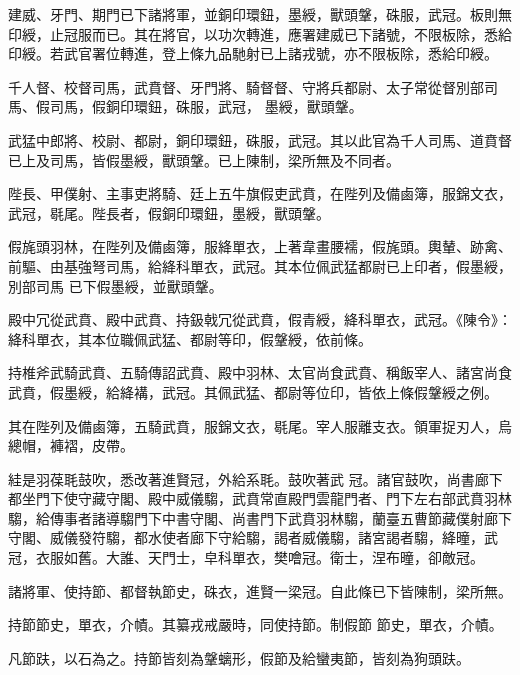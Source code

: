 \begin{pinyinscope}
 建威、牙門、期門已下諸將軍，並銅印環鈕，墨綬，獸頭鞶，硃服，武冠。板則無印綬，止冠服而已。其在將官，以功次轉進，應署建威已下諸號，不限板除，悉給印綬。若武官署位轉進，登上條九品馳射已上諸戎號，亦不限板除，悉給印綬。



 千人督、校督司馬，武賁督、牙門將、騎督督、守將兵都尉、太子常從督別部司馬、假司馬，假銅印環鈕，硃服，武冠，
 墨綬，獸頭鞶。



 武猛中郎將、校尉、都尉，銅印環鈕，硃服，武冠。其以此官為千人司馬、道賁督已上及司馬，皆假墨綬，獸頭鞶。已上陳制，梁所無及不同者。



 陛長、甲僕射、主事吏將騎、廷上五牛旗假吏武賁，在陛列及備鹵簿，服錦文衣，武冠，毼尾。陛長者，假銅印環鈕，墨綬，獸頭鞶。



 假旄頭羽林，在陛列及備鹵簿，服絳單衣，上著韋畫腰襦，假旄頭。輿輦、跡禽、前驅、由基強弩司馬，給絳科單衣，武冠。其本位佩武猛都尉已上印者，假墨綬，別部司馬
 已下假墨綬，並獸頭鞶。



 殿中冗從武賁、殿中武賁、持鈒戟冗從武賁，假青綬，絳科單衣，武冠。《陳令》：絳科單衣，其本位職佩武猛、都尉等印，假鞶綬，依前條。



 持椎斧武騎武賁、五騎傳詔武賁、殿中羽林、太官尚食武賁、稱飯宰人、諸宮尚食武賁，假墨綬，給絳褠，武冠。其佩武猛、都尉等位印，皆依上條假鞶綬之例。



 其在陛列及備鹵簿，五騎武賁，服錦文衣，毼尾。宰人服離支衣。領軍捉刃人，烏總帽，褲褶，皮帶。



 絓是羽葆毦鼓吹，悉改著進賢冠，外給系毦。鼓吹著武
 冠。諸官鼓吹，尚書廊下都坐門下使守藏守閣、殿中威儀騶，武賁常直殿門雲龍門者、門下左右部武賁羽林騶，給傳事者諸導騶門下中書守閣、尚書門下武賁羽林騶，蘭臺五曹節藏僕射廊下守閣、威儀發符騶，都水使者廊下守給騶，謁者威儀騶，諸宮謁者騶，絳曈，武冠，衣服如舊。大誰、天門士，皁科單衣，樊噲冠。衛士，涅布曈，卻敵冠。



 諸將軍、使持節、都督執節史，硃衣，進賢一梁冠。自此條已下皆陳制，梁所無。



 持節節史，單衣，介幘。其纂戎戒嚴時，同使持節。制假節
 節史，單衣，介幘。



 凡節趺，以石為之。持節皆刻為鞶螭形，假節及給蠻夷節，皆刻為狗頭趺。




\end{pinyinscope}
